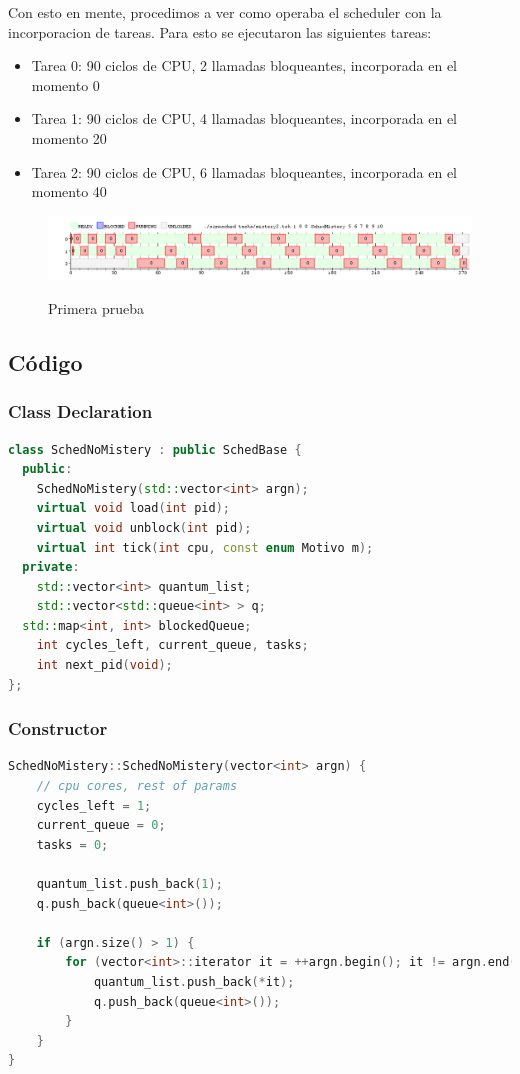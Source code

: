 Con esto en mente, procedimos a ver como operaba el scheduler con la incorporacion de tareas. Para esto se ejecutaron las siguientes tareas:

\begin{itemize}
	\item Tarea 0: 90 ciclos de CPU, 2 llamadas bloqueantes, incorporada en el momento 0
	\item Tarea 1: 90 ciclos de CPU, 4 llamadas bloqueantes, incorporada en el momento 20
	\item Tarea 2: 90 ciclos de CPU, 6 llamadas bloqueantes, incorporada en el momento 40
\end{itemize}

\begin{figure}[h]
    \includegraphics[width=\linewidth]{images/mist2.png}
    \label{fig:Task Consola}
    \caption{Primera prueba}
\end{figure}

\subsection{Código}

\subsubsection{Class Declaration}
\begin{lstlisting}[language=C++, breaklines=true]
class SchedNoMistery : public SchedBase {
  public:
    SchedNoMistery(std::vector<int> argn);
    virtual void load(int pid);
    virtual void unblock(int pid);
    virtual int tick(int cpu, const enum Motivo m);
  private:
	std::vector<int> quantum_list;
	std::vector<std::queue<int> > q;
  std::map<int, int> blockedQueue;
	int cycles_left, current_queue, tasks;
	int next_pid(void);
};
\end{lstlisting}


\subsubsection{Constructor}
\begin{lstlisting}[language=C++, breaklines=true]
SchedNoMistery::SchedNoMistery(vector<int> argn) {
	// cpu cores, rest of params
	cycles_left = 1;
	current_queue = 0;
	tasks = 0;

	quantum_list.push_back(1);
	q.push_back(queue<int>());

	if (argn.size() > 1) {
		for (vector<int>::iterator it = ++argn.begin(); it != argn.end(); ++it) {
			quantum_list.push_back(*it);
			q.push_back(queue<int>());
		}
	}
}
\end{lstlisting}


